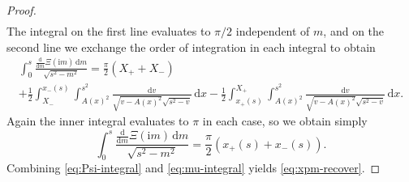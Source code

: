 \documentclass[10pt,a4paper]{amsart}
\newcommand{\dd}{\mathrm{d}}
\newcommand{\ii}{\mathrm{i}}
\newcommand{\tailint}{\Xi}
\begin{document}
\begin{proof}
\begin{multline}
\end{multline}
The integral on the first line evaluates to $\pi/2$ independent of $m$, and on the second line we exchange the order of integration in each integral to obtain
\begin{multline}
\int_0^s\frac{\displaystyle\frac{\dd}{\dd m}\tailint(\ii m)\,\dd m}{\sqrt{s^2-m^2}} =\frac{\pi}{2}(X_++X_-)\\ +
\frac{1}{2}\int_{X_-}^{x_-(s)}\int_{A(x)^2}^{s^2}\frac{\dd v}{\sqrt{v-A(x)^2}\sqrt{s^2-v}}\,\dd x -\frac{1}{2}\int_{x_+(s)}^{X_+}\int_{A(x)^2}^{s^2}\frac{\dd v}{\sqrt{v-A(x)^2}\sqrt{s^2-v}}\,\dd x.
\end{multline}
Again the inner integral evaluates to $\pi$ in each case, so we obtain simply
\begin{equation}
\int_0^s\frac{\displaystyle\frac{\dd}{\dd m}\tailint(\ii m)\,\dd m}{\sqrt{s^2-m^2}} =\frac{\pi}{2}(x_+(s)+x_-(s)).
\label{eq:mu-integral}
\end{equation}
Combining \eqref{eq:Psi-integral} and \eqref{eq:mu-integral} yields \eqref{eq:xpm-recover}.
\end{proof}
\end{document}
